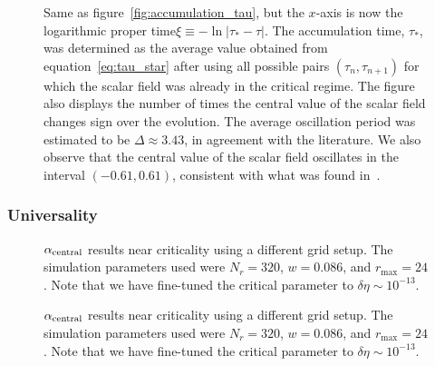 \documentclass[a4paper,11pt]{article}
\renewcommand{\d}{\delta}
\newcommand{\D}{\Delta}
\newcommand{\lrpar}[1]{\left( #1 \right)}
\newcommand{\abs}[1]{\left| #1 \right|}
\begin{document}
\begin{figure}[htt]
  \centering
  
  \caption[Central value of the scalar field, $\phi_{\rm central}$, near criticality as a function of logarithmic proper time, $\xi$.]{Same as figure~\ref{fig:accumulation_tau}, but the $x$-axis is now the logarithmic proper time\linebreak $\xi\equiv-\ln\abs{\tau_{*}-\tau}$. The accumulation time, $\tau_{*}$, was determined as the average value obtained from equation~\eqref{eq:tau_star} after using all possible pairs $\lrpar{\tau_{n},\tau_{n+1}}$ for which the scalar field was already in the critical regime. The figure also displays the number of times the central value of the scalar field changes sign over the evolution. The average oscillation period was estimated to be $\D \approx 3.43$, in agreement with the literature. We also observe that the central value of the scalar field oscillates in the interval $\lrpar{-0.61,0.61}$, consistent with what was found in~\cite{PhysRevLett.70.9,PhysRevD.92.084037,Baumgarte_2018}.}
  \label{fig:accumulation_Lambda}
\end{figure}

\subsubsection{Universality}

\begin{figure}[H]
  \centering
  
  \caption[$\alpha_{\rm central}$ results near criticality using a different grid setup.]{$\alpha_{\rm central}$ results near criticality using a different grid setup. The simulation parameters used were $N_{r}=320$, $w=0.086$, and $r_{\max}=24$. Note that we have fine-tuned the critical parameter to $\d\eta\sim10^{-13}$.}
  \label{fig:critical_alpha_v2}
\end{figure}

\begin{figure}[H]
  \centering
  
  \caption[$\alpha_{\rm central}$ results near criticality using a different grid setup.]{$\alpha_{\rm central}$ results near criticality using a different grid setup. The simulation parameters used were $N_{r}=320$, $w=0.086$, and $r_{\max}=24$. Note that we have fine-tuned the critical parameter to $\d\eta\sim10^{-13}$.}
  \label{fig:critical_alpha_tanh}
\end{figure}

\setlength{\abovecaptionskip}{16pt plus 0pt minus 0pt}
\end{document}
